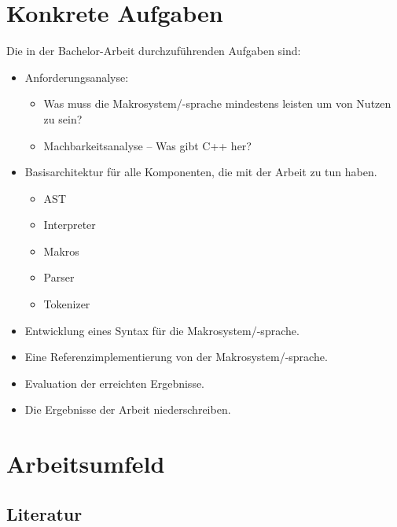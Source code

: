 \section{Konkrete Aufgaben}
\label{sec:konkrete_aufgaben}
  Die in der Bachelor-Arbeit durchzuführenden Aufgaben sind:
  \begin{itemize}
    \item Anforderungsanalyse:
      \begin{itemize}
        \item Was muss die Makrosystem/-sprache mindestens leisten um von Nutzen zu sein?
        \item Machbarkeitsanalyse -- Was gibt C++ her?
      \end{itemize}
    \item Basisarchitektur für alle Komponenten, die mit der Arbeit zu tun haben.
      \begin{itemize}
        \item AST
        \item Interpreter
        \item Makros
        \item Parser
        \item Tokenizer
      \end{itemize}
    \item Entwicklung eines Syntax für die Makrosystem/-sprache.
    \item Eine Referenzimplementierung von der Makrosystem/-sprache.
    \item Evaluation der erreichten Ergebnisse.
    \item Die Ergebnisse der Arbeit niederschreiben.
  \end{itemize}

\section{Arbeitsumfeld}
\label{sec:arbeitsumfeld}

  \subsection{Literatur}
  \label{ssec:literatur}
    \nocite{*}
    \printbibliography



